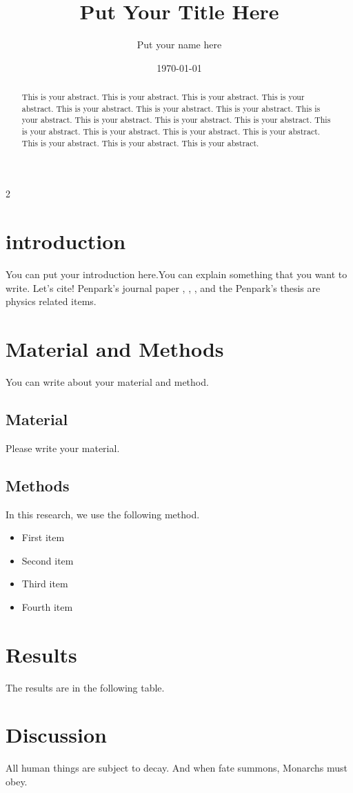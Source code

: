 \documentclass{article}
\title{Put Your Title Here}
\author{Put your name here}
\date{\today}
\begin{document}
\maketitle
\begin{abstract}
This is your abstract. This is your abstract. This is your abstract. This
is your abstract. This is your abstract. This is your abstract.   This is
your abstract. This is your abstract. This is your abstract. This is
your abstract. This is your abstract. This is your abstract.   This is your
abstract. This is your abstract. This is your abstract. This is your
abstract. This is your abstract. This is your abstract.
\end{abstract}
\begin{multicols}{2}
\section{introduction}
You can put your introduction here.You can explain something that you want to write.
Let's cite!  Penpark's journal paper \cite{sirimark2018surface},
\cite{sirimark2019surface} , \cite{lukyanov2020capillary}, and the Penpark's thesis \cite{sirimark2019mathematical} are physics related items. 
\section{Material and Methods}
You can write about your material and method.
\subsection{Material}
Please write your material.\\
{\Large \color{green}{Put your picture  here }}
\subsection{Methods}
In this research, we use the following method. 
\begin{itemize}
\color{blue}
\item First item
\item Second item
\item Third item
\item Fourth item
\end{itemize}

\section{Results}
The results are in the following table.\\
{\Large \color{red}{Put your table here }}
\section{Discussion}
All human things are subject to decay. And when fate summons, Monarchs must obey.
\end{multicols}


\end{document}
